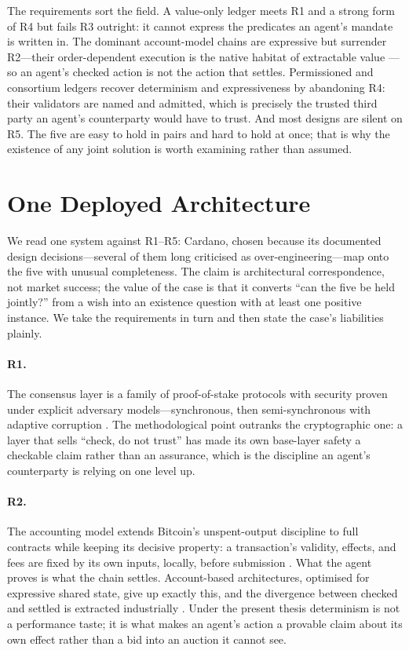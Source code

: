 \documentclass[11pt]{article}
\newcommand{\R}[1]{R#1}
\begin{document}
The requirements sort the field. A value-only ledger meets \R{1} and a
strong form of \R{4} but fails \R{3} outright: it cannot express the
predicates an agent's mandate is written in. The dominant account-model
chains are expressive but surrender \R{2}---their order-dependent
execution is the native habitat of extractable value
\citep{daian2020flashboys}---so an agent's checked action is not the
action that settles. Permissioned and consortium ledgers recover
determinism and expressiveness by abandoning \R{4}: their validators are
named and admitted, which is precisely the trusted third party an agent's
counterparty would have to trust. And most designs are silent on \R{5}.
The five are easy to hold in pairs and hard to hold at once; that is why
the existence of any joint solution is worth examining rather than
assumed.

\section{One Deployed Architecture}
\label{sec:case}

We read one system against \R{1}--\R{5}: Cardano, chosen because its
documented design decisions---several of them long criticised as
over-engineering---map onto the five with unusual completeness. The claim
is architectural correspondence, not market success; the value of the
case is that it converts ``can the five be held jointly?'' from a wish
into an existence question with at least one positive instance. We take
the requirements in turn and then state the case's liabilities plainly.

\paragraph{\R{1}.}
The consensus layer is a family of proof-of-stake protocols with security
proven under explicit adversary models---synchronous, then
semi-synchronous with adaptive corruption
\citep{kiayias2017ouroboros,david2018praos}. The methodological point
outranks the cryptographic one: a layer that sells ``check, do not
trust'' has made its own base-layer safety a checkable claim rather than
an assurance, which is the discipline an agent's counterparty is relying
on one level up.

\paragraph{\R{2}.}
The accounting model extends Bitcoin's unspent-output discipline to full
contracts while keeping its decisive property: a transaction's validity,
effects, and fees are fixed by its own inputs, locally, before submission
\citep{chakravarty2020eutxo}. What the agent proves is what the chain
settles. Account-based architectures, optimised for expressive shared
state, give up exactly this, and the divergence between checked and
settled is extracted industrially \citep{daian2020flashboys}. Under the
present thesis determinism is not a performance taste; it is what makes
an agent's action a provable claim about its own effect rather than a bid
into an auction it cannot see.
\end{document}
